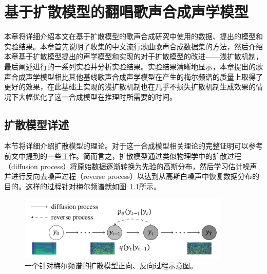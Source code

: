 \newcommand{\etal}{\textit{et al}.}
\newcommand{\ie}{\textit{i}.\textit{e}.}
\newcommand{\vardbtilde}[1]{\tilde{\raisebox{0pt}[0.85\height]{$\tilde{#1}$}}}
\newcommand{\defeq}{\coloneqq}
\newcommand{\grad}{\nabla}
\newcommand{\E}{\mathbb{E}}
\newcommand{\Var}{\mathrm{Var}}
\newcommand{\Cov}{\mathrm{Cov}}
\newcommand{\Ea}[1]{\E\left[#1\right]}
\newcommand{\Eb}[2]{\E_{#1}\!\left[#2\right]}
\newcommand{\Vara}[1]{\Var\left[#1\right]}
\newcommand{\Varb}[2]{\Var_{#1}\left[#2\right]}
\newcommand{\kl}[2]{D_{\mathrm{KL}}\!\left(#1 ~ \| ~ #2\right)}
\newcommand{\pdata}{{p_\mathrm{data}}}
\newcommand{\bA}{\mathbf{A}}
\newcommand{\bI}{\mathbf{I}}
\newcommand{\bJ}{\mathbf{J}}
\newcommand{\bH}{\mathbf{H}}
\newcommand{\bL}{\mathbf{L}}
\newcommand{\bM}{\mathbf{M}}
\newcommand{\bQ}{\mathbf{Q}}
\newcommand{\bR}{\mathbf{R}}
\newcommand{\bzero}{\mathbf{0}}
\newcommand{\bone}{\mathbf{1}}
\newcommand{\bb}{\mathbf{b}}
\newcommand{\bu}{\mathbf{u}}
\newcommand{\bv}{\mathbf{v}}
\newcommand{\bw}{\mathbf{w}}
\newcommand{\bx}{\mathbf{x}}
\newcommand{\by}{\mathbf{y}}
\newcommand{\bz}{\mathbf{z}}
\newcommand{\bxh}{\hat{\mathbf{x}}}
\newcommand{\btheta}{{\boldsymbol{\theta}}}
\newcommand{\bphi}{{\boldsymbol{\phi}}}
\newcommand{\bepsilon}{{\boldsymbol{\epsilon}}}
\newcommand{\bmu}{{\boldsymbol{\mu}}}
\newcommand{\bnu}{{\boldsymbol{\nu}}}
\chapter{基于扩散模型的翻唱歌声合成声学模型}
\label{sec:svs}
本章将详细介绍本文在基于扩散模型的歌声合成研究中使用的数据、提出的模型和实验结果。本章首先说明了收集的中文流行歌曲歌声合成数据集的方法，然后介绍本章基于扩散模型提出的声学模型和实现的对于扩散模型的改进——浅扩散机制，最后阐述进行的一系列实验并分析实验结果。实验结果清晰地显示，本章提出的歌声合成声学模型相比其他基线歌声合成声学模型在产生的梅尔频谱的质量上取得了更好的效果，在此基础上实现的浅扩散机制也在几乎不损失扩散机制生成效果的情况下大幅优化了这一合成模型在推理时所需要的时间。
\section{扩散模型详述}
本节将详细介绍扩散模型的理论。对于这一合成模型相关理论的完整证明可以参考前文中提到的一些工作\citep{Ho2020ddpm,kong2021diffwave,song2021denoising}。简而言之，扩散模型通过类似物理学中的扩散过程（diffusion process）将原始数据逐渐转换为先验的高斯分布，然后学习估计噪声并进行反向去噪声过程（reverse process）以达到从高斯白噪声中恢复数据分布的目的。这样的过程针对梅尔频谱就如图~\ref{fig:two_process}所示。
\begin{figure}[!h]
	\centering
	\includegraphics[width=0.90\textwidth]{figure/svs/diffusion-new.pdf}
	\caption{一个针对梅尔频谱的扩散模型正向、反向过程示意图。}
	\label{fig:two_process}
\end{figure}
